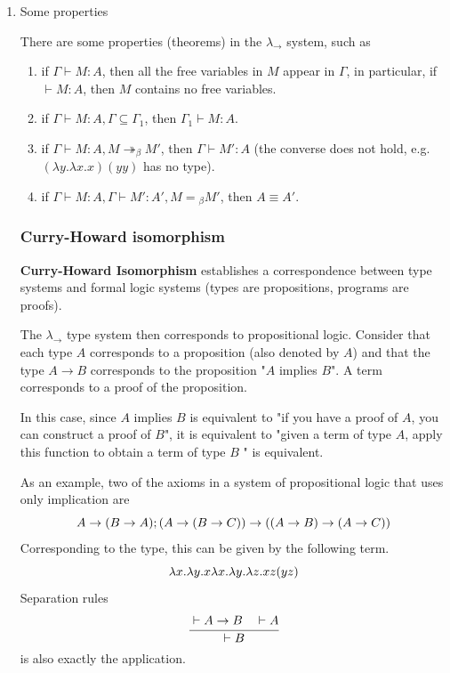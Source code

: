 \documentclass[a4paper]{exam}
\begin{document}
\begin{enumerate}
\item Some properties

There are some properties (theorems) in the $\lambda_\to$ system, such as

\begin{enumerate}
  \item if $\Gamma\vdash M:A$, then all the free variables in $M$ appear in $\Gamma$, in particular, if $\vdash M:A$, then $M$ contains no free variables.
  \item if $\Gamma \vdash M:A, \Gamma\subseteq\Gamma_1$, then $\Gamma_1\vdash M:A$.
  \item if $\Gamma\vdash M:A,M\twoheadrightarrow _ \beta M'$, then $\Gamma\vdash M':A$ (the converse does not hold, e.g. $(\lambda y.\lambda x.x)(yy)$ has no type).
  \item if $\Gamma\vdash M:A,\Gamma\vdash M':A',M={ }_\beta M'$, then $A\equiv A'$.
\end{enumerate}

\subsubsection{Curry-Howard isomorphism \cite{softwarefoundation}}

\textbf{Curry-Howard Isomorphism} establishes a correspondence between type systems and formal logic systems (types are propositions, programs are proofs).

The $\lambda_\to$ type system then corresponds to propositional logic. Consider that each type $A$ corresponds to a proposition (also denoted by $A$) and that the type $A\to B$ corresponds to the proposition "$A$ implies $B$". A term corresponds to a proof of the proposition.

In this case, since $A$ implies $B$ is equivalent to "if you have a proof of $A$, you can construct a proof of $B$", it is equivalent to "given a term of type $A$, apply this function to obtain a term of type $B$ " is equivalent.

As an example, two of the axioms in a system of propositional logic that uses only implication are
$$
  A\to (B\to A);\\
  (A\to(B\to C))\to((A\to B)\to(A\to C))
$$
Corresponding to the type, this can be given by the following term.
$$
  \lambda x.\lambda y.x\\
  \lambda x.\lambda y.\lambda z.xz(yz)
$$
Separation rules
$$
  \cfrac{\vdash A\to B\quad\vdash A}{\vdash B}
$$
is also exactly the application.


\end{enumerate}
\end{document}
